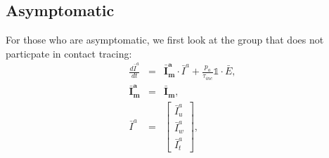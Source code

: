\documentclass[notitlepage, superscriptaddress]{revtex4-2}
\begin{document}
\subsection{Asymptomatic}
For those who are asymptomatic, we first look at the group that does not particpate in contact tracing:
\begin{eqnarray}
\frac{d\bar{I}^{a}}{dt} &=& \boldsymbol{\bar{I}^{a}_{m}} \cdot \bar{I}^{a} + \frac{p_{a}}{\tau_{inc}} \mathbb{1} \cdot  \bar{E}, \\ 
\boldsymbol{\bar{I}^{a}_{m}} &=& \boldsymbol{\bar{I}_{m}}, \\ 
%
\bar{I}^{a} &=& 
\begin{bmatrix}
\bar{I}^{a}_{u} \\ \bar{I}^{a}_{w}\\ \bar{I}^{a}_{t}
\end{bmatrix},
\end{eqnarray}
\end{document}
